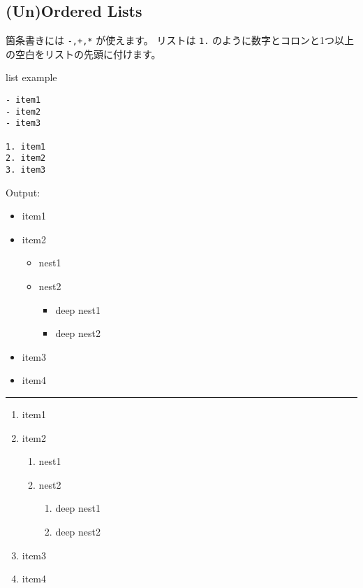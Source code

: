 \documentclass[a4j, titlepage]{jarticle}
\begin{document}
\subsection{(Un)Ordered Lists}

箇条書きには {\tt -,+,*} が使えます。
リストは {\tt 1.} のように数字とコロンと1つ以上の空白をリストの先頭に付けます。

\begin{itembox}[c]{list example}
\begin{verbatim}
- item1
- item2
- item3

1. item1
2. item2
3. item3
\end{verbatim}
\end{itembox}

Output:

\begin{itemize}
\item item1
\item item2


\begin{itemize}
\item nest1
\item nest2


\begin{itemize}
\item deep nest1
\item deep nest2
\end{itemize}
\end{itemize}
\item item3
\item item4
\end{itemize}

\begin{center}
\rule{3in}{0.4pt}
\end{center}

\begin{enumerate}
\item item1
\item item2


\begin{enumerate}
\item nest1
\item nest2


\begin{enumerate}
\item deep nest1
\item deep nest2
\end{enumerate}
\end{enumerate}
\item item3
\item item4
\end{enumerate}
\end{document}
